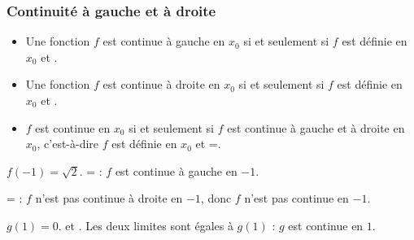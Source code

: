 \subsubsection{Continuité à gauche et à droite}%
\begin{definition}[s]
	\begin{itemize}
		\item Une fonction $f$ est continue à gauche en $x_0$ si et seulement si $f$ est définie en $x_0$ et .
		\item Une fonction $f$ est continue à droite en $x_0$ si et seulement si $f$ est définie en $x_0$ et .
		\item $f$ est continue en $x_0$ si et seulement si $f$ est continue à gauche et à droite en $x_0$, c'est-à-dire $f$ est définie en $x_0$ et =.
	\end{itemize}
\end{definition}%
\fi %
\begin{corrigeprof}[10]
\be
\item[(a)] $f(-1)=\sqrt{2}$. = : $f$ est continue à gauche en $-1$.
\par {}= : $f$ n'est pas continue à droite en $-1$, donc $f$ n'est pas continue en $-1$.
\item[(b)] $g(1)=0$.  et . Les deux limites sont égales à $g(1)$ : $g$ est continue en $1$.
\ee
\end{corrigeprof}
\ifenseignant %
